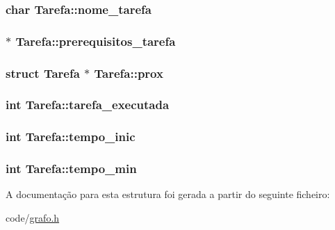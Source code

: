 \hypertarget{structTarefa_aa4224aa0787334f3194ba773f3924ade}{
\subsubsection[{nome\-\_\-tarefa}]{\setlength{\rightskip}{0pt plus 5cm}char Tarefa\-::nome\-\_\-tarefa}}\label{structTarefa_aa4224aa0787334f3194ba773f3924ade}
\hypertarget{structTarefa_ad29b83112b237fad5d5d56f39b21f6a6}{
\subsubsection[{prerequisitos\-\_\-tarefa}]{ $\ast$ Tarefa\-::prerequisitos\-\_\-tarefa}}\label{structTarefa_ad29b83112b237fad5d5d56f39b21f6a6}
\hypertarget{structTarefa_a965f93c11a90c05d417d2e1ed8eac327}{
\subsubsection[{prox}]{\setlength{\rightskip}{0pt plus 5cm}struct {\bf Tarefa} $\ast$ Tarefa\-::prox}}\label{structTarefa_a965f93c11a90c05d417d2e1ed8eac327}
\hypertarget{structTarefa_a86ef331b855e3f91eec492a00171cc9c}{
\subsubsection[{tarefa\-\_\-executada}]{\setlength{\rightskip}{0pt plus 5cm}int Tarefa\-::tarefa\-\_\-executada}}\label{structTarefa_a86ef331b855e3f91eec492a00171cc9c}
\hypertarget{structTarefa_a202a3c8fbee0bf74488fa057587f13df}{
\subsubsection[{tempo\-\_\-inic}]{\setlength{\rightskip}{0pt plus 5cm}int Tarefa\-::tempo\-\_\-inic}}\label{structTarefa_a202a3c8fbee0bf74488fa057587f13df}
\hypertarget{structTarefa_a4fd1b4c3fd98a3fb754116f6cc80c906}{
\subsubsection[{tempo\-\_\-min}]{\setlength{\rightskip}{0pt plus 5cm}int Tarefa\-::tempo\-\_\-min}}\label{structTarefa_a4fd1b4c3fd98a3fb754116f6cc80c906}


A documentação para esta estrutura foi gerada a partir do seguinte ficheiro\-:\begin{DoxyCompactItemize}
\item 
code/\hyperlink{code_2grafo_8h}{grafo.\-h}\end{DoxyCompactItemize}
